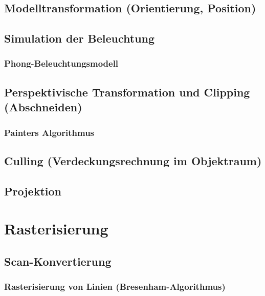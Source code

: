 \documentclass[a4paper, 11pt, accentcolor = tud3b]{tudreport}
\begin{document}
			\subsection{Modelltransformation (Orientierung, Position)} %

			\subsection{Simulation der Beleuchtung} %

				\subsubsection{Phong-Beleuchtungsmodell} %

			\subsection{Perspektivische Transformation und Clipping (Abschneiden)} %

				\subsubsection{Painters Algorithmus} %

			\subsection{Culling (Verdeckungsrechnung im Objektraum)} %

			\subsection{Projektion} %

		\section{Rasterisierung} %

			\subsection{Scan-Konvertierung} %

				\subsubsection{Rasterisierung von Linien (Bresenham-Algorithmus)} %
\end{document}
